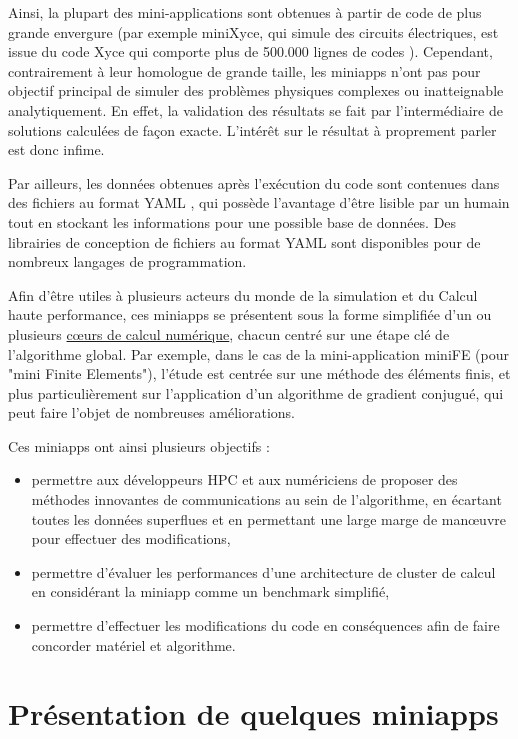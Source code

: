 \documentclass[11pt,a4paper,oneside]{memoir}
\theoremstyle{definition}
\theoremstyle{remark}
\theoremstyle{plain}
\begin{document}
Ainsi, la plupart des mini-applications sont obtenues à partir de code de plus grande envergure (par exemple miniXyce, qui simule des circuits électriques, est issue du code Xyce qui comporte plus de 500.000 lignes de codes \cite{sandia2009}). Cependant, contrairement à leur homologue de grande taille, les miniapps n'ont pas pour objectif principal de simuler des problèmes physiques complexes ou inatteignable analytiquement. En effet, la validation des résultats se fait par l'intermédiaire de solutions calculées de façon exacte. L'intérêt sur le résultat à proprement parler est donc infime.

Par ailleurs, les données obtenues après l'exécution du code sont contenues dans des fichiers au format YAML \cite{yaml}, qui possède l'avantage d'être lisible par un humain tout en stockant les informations pour une possible base de données. Des librairies de conception de fichiers au format YAML sont disponibles pour de nombreux langages de programmation.\bigskip

Afin d'être utiles à plusieurs acteurs du monde de la simulation et du Calcul haute performance, ces miniapps se présentent sous la forme simplifiée d'un ou plusieurs \underline{cœurs de calcul numérique}, chacun centré sur une étape clé de l'algorithme global. Par exemple, dans le cas de la mini-application miniFE (pour "mini Finite Elements"), l'étude est centrée sur une méthode des éléments finis, et plus particulièrement sur l'application d'un algorithme de gradient conjugué, qui peut faire l'objet de nombreuses améliorations.

Ces miniapps ont ainsi plusieurs objectifs :
\begin{itemize}
\item permettre aux développeurs HPC et aux numériciens de proposer des méthodes innovantes de communications au sein de l'algorithme, en écartant toutes les données superflues et en permettant une large marge de manœuvre pour effectuer des modifications,
\item permettre d'évaluer les performances d'une architecture de cluster de calcul en considérant la miniapp comme un benchmark simplifié,
\item permettre d'effectuer les modifications du code en conséquences afin de faire concorder matériel et algorithme.
\end{itemize}\bigskip



\section{Présentation de quelques miniapps}
\end{document}

